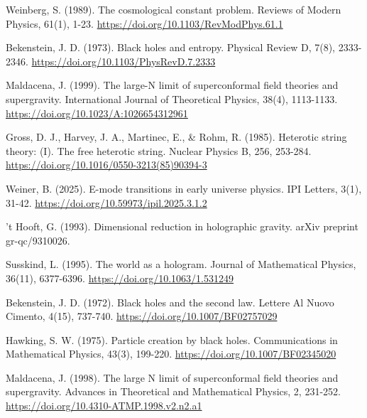 \documentclass[11pt,english,twoside]{article}
\begin{document}
\begin{thebibliography}{99}

 Weinberg, S. (1989). The cosmological constant problem. Reviews of Modern Physics, 61(1), 1-23. \href{https://doi.org/10.1103/RevModPhys.61.1}{https://doi.org/10.1103/RevModPhys.61.1}

 Bekenstein, J. D. (1973). Black holes and entropy. Physical Review D, 7(8), 2333-2346. \href{https://doi.org/10.1103/PhysRevD.7.2333}{https://doi.org/10.1103/PhysRevD.7.2333}

 Maldacena, J. (1999). The large-N limit of superconformal field theories and supergravity. International Journal of Theoretical Physics, 38(4), 1113-1133. \href{https://doi.org/10.1023/A:1026654312961}{https://doi.org/10.1023/A:1026654312961}

 Gross, D. J., Harvey, J. A., Martinec, E., \& Rohm, R. (1985). Heterotic string theory: (I). The free heterotic string. Nuclear Physics B, 256, 253-284. \href{https://doi.org/10.1016/0550-3213(85)90394-3}{https://doi.org/10.1016/0550-3213(85)90394-3}

 Weiner, B. (2025). E-mode transitions in early universe physics. IPI Letters, 3(1), 31-42. \href{https://doi.org/10.59973/ipil.2025.3.1.2}{https://doi.org/10.59973/ipil.2025.3.1.2}

 't Hooft, G. (1993). Dimensional reduction in holographic gravity. arXiv preprint gr-qc/9310026.

 Susskind, L. (1995). The world as a hologram. Journal of Mathematical Physics, 36(11), 6377-6396. \href{https://doi.org/10.1063/1.531249}{https://doi.org/10.1063/1.531249}

 Bekenstein, J. D. (1972). Black holes and the second law. Lettere Al Nuovo Cimento, 4(15), 737-740. \href{https://doi.org/10.1007/BF02757029}{https://doi.org/10.1007/BF02757029}

 Hawking, S. W. (1975). Particle creation by black holes. Communications in Mathematical Physics, 43(3), 199-220. \href{https://doi.org/10.1007/BF02345020}{https://doi.org/10.1007/BF02345020}

 Maldacena, J. (1998). The large N limit of superconformal field theories and supergravity. Advances in Theoretical and Mathematical Physics, 2, 231-252. \href{https://doi.org/10.4310-ATMP.1998.v2.n2.a1}{https://doi.org/10.4310-ATMP.1998.v2.n2.a1}


\end{thebibliography}
\end{document}

